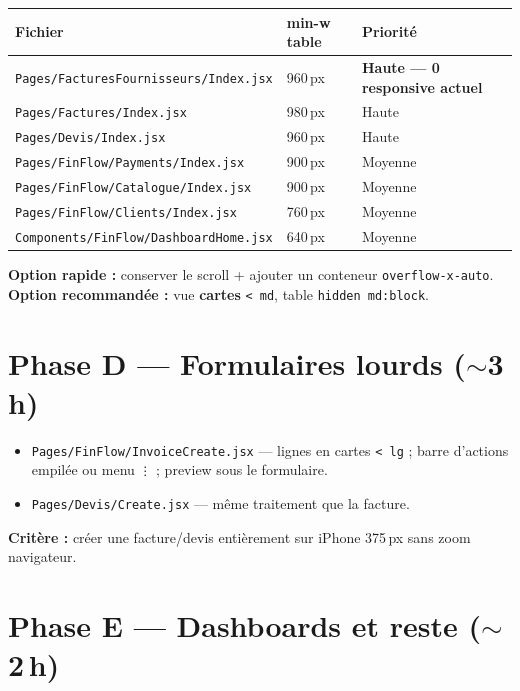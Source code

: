 \documentclass[11pt,a4paper]{report}
\newcommand{\filepath}[1]{\texttt{\small #1}}
\begin{document}
\begin{longtable}{@{}p{5.8cm}p{2.2cm}p{6.3cm}@{}}
\toprule
\textbf{Fichier} & \textbf{min-w table} & \textbf{Priorité} \\
\midrule
\endhead
\filepath{Pages/FacturesFournisseurs/Index.jsx} & 960\,px & \textcolor{copifiemerald}{\textbf{Haute — 0 responsive actuel}} \\
\filepath{Pages/Factures/Index.jsx} & 980\,px & Haute \\
\filepath{Pages/Devis/Index.jsx} & 960\,px & Haute \\
\filepath{Pages/FinFlow/Payments/Index.jsx} & 900\,px & Moyenne \\
\filepath{Pages/FinFlow/Catalogue/Index.jsx} & 900\,px & Moyenne \\
\filepath{Pages/FinFlow/Clients/Index.jsx} & 760\,px & Moyenne \\
\filepath{Components/FinFlow/DashboardHome.jsx} & 640\,px & Moyenne \\
\bottomrule
\end{longtable}

\textbf{Option rapide :} conserver le scroll + ajouter un conteneur \texttt{overflow-x-auto}.\\
\textbf{Option recommandée :} vue \textbf{cartes} \texttt{< md}, table \texttt{hidden md:block}.

\section{Phase D — Formulaires lourds ($\sim$3\,h)}

\begin{itemize}[leftmargin=1.5em]
    \item \filepath{Pages/FinFlow/InvoiceCreate.jsx} — lignes en cartes \texttt{< lg} ; barre d'actions empilée ou menu \texttt{⋮} ; preview sous le formulaire.
    \item \filepath{Pages/Devis/Create.jsx} — même traitement que la facture.
\end{itemize}

\textbf{Critère :} créer une facture/devis entièrement sur iPhone 375\,px sans zoom navigateur.

\section{Phase E — Dashboards et reste ($\sim$2\,h)}
\end{document}
